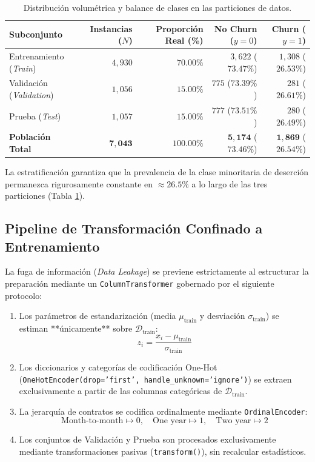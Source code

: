 \documentclass[11pt,letterpaper]{article}
\begin{document}
\begin{table}[H]
    \centering
    \small
    \caption{Distribución volumétrica y balance de clases en las particiones de datos.}
    \label{tab:partitions}
    \begin{tabular}{lrrrr}
        \toprule
        \textbf{Subconjunto} & \textbf{Instancias ($N$)} & \textbf{Proporción Real (\%)} & \textbf{No Churn ($y=0$)} & \textbf{Churn ($y=1$)} \\
        \midrule
        Entrenamiento (\textit{Train}) & $4,930$ & $70.00\%$ & $3,622$ ($73.47\%$) & $1,308$ ($26.53\%$) \\
        Validación (\textit{Validation}) & $1,056$ & $15.00\%$ & $775$ ($73.39\%$) & $281$ ($26.61\%$) \\
        Prueba (\textit{Test}) & $1,057$ & $15.00\%$ & $777$ ($73.51\%$) & $280$ ($26.49\%$) \\
        \midrule
        \textbf{Población Total} & $\mathbf{7,043}$ & $\mathbf{100.00\%}$ & $\mathbf{5,174}$ ($\mathbf{73.46\%}$) & $\mathbf{1,869}$ ($\mathbf{26.54\%}$) \\
        \bottomrule
    \end{tabular}
\end{table}

La estratificación garantiza que la prevalencia de la clase minoritaria de deserción permanezca rigurosamente constante en $\approx 26.5\%$ a lo largo de las tres particiones (Tabla \ref{tab:partitions}).

\subsection{Pipeline de Transformación Confinado a Entrenamiento}
La fuga de información (\textit{Data Leakage}) se previene estrictamente al estructurar la preparación mediante un \texttt{ColumnTransformer} gobernado por el siguiente protocolo:
\begin{enumerate}
    \item Los parámetros de estandarización (media $\mu_{\text{train}}$ y desviación $\sigma_{\text{train}}$) se estiman **únicamente** sobre $\mathcal{D}_{\text{train}}$:
    \begin{equation}
        z_i = \frac{x_i - \mu_{\text{train}}}{\sigma_{\text{train}}}
    \end{equation}
    \item Los diccionarios y categorías de codificación One-Hot (\texttt{OneHotEncoder(drop='first', handle\_unknown='ignore')}) se extraen exclusivamente a partir de las columnas categóricas de $\mathcal{D}_{\text{train}}$.
    \item La jerarquía de contratos se codifica ordinalmente mediante \texttt{OrdinalEncoder}:
    \begin{equation}
        \text{Month-to-month} \mapsto 0, \quad \text{One year} \mapsto 1, \quad \text{Two year} \mapsto 2
    \end{equation}
    \item Los conjuntos de Validación y Prueba son procesados exclusivamente mediante transformaciones pasivas (\texttt{transform()}), sin recalcular estadísticos.
\end{enumerate}
\end{document}
